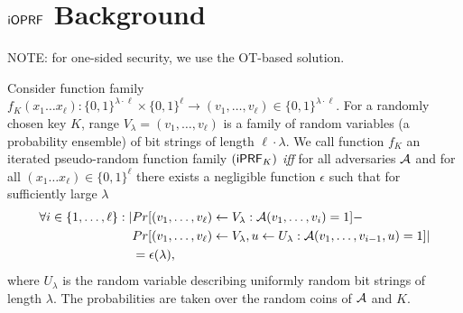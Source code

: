 \section{$\mathsf{i}\mathsf{OPRF}$ Background}
NOTE: for one-sided security, we use the OT-based solution.



\begin{definition}[$\iprf$]
  Consider function family
  $f_K(x_1\ldots{}x_\ell):\{0,1\}^{\lambda\cdot\ell}\times\{0,1\}^{\ell}\rightarrow{}(v_1,\ldots,v_\ell)\in\{0,1\}^{\lambda\cdot\ell}$. For
  a randomly chosen key $K$, range $V_\lambda=(v_1,\ldots,v_\ell)$ is
  a family of random variables (a probability ensemble) of bit strings
  of length $\ell\cdot\lambda$. We call function $f_K$ an iterated
  pseudo-random function family $(\mathsf{i}\mathsf{PRF}_K)$ \emph{iff} for all
  adversaries ${\mathcal{A}}$ and for all $(x_1\ldots{}x_\ell)\in\{0,1\}^\ell$
  there exists a negligible function $\epsilon$ such that for
  sufficiently large $\lambda$
\begin{align*}\forall{}i\in\{1,\ldots,\ell\}:|&Pr[(v_1,\ldots,v_\ell)\leftarrow{}V_\lambda:{\mathcal{A}}(v_1,\ldots,v_i)=1]-\\&Pr[(v_1,\ldots,v_\ell)\leftarrow{}V_\lambda,u\leftarrow{}U_\lambda:{\mathcal{A}}(v_1,\ldots,v_{i-1},u)=1]|\\&=\epsilon(\lambda),
  \end{align*}
  where $U_\lambda$ is the random variable describing uniformly random
  bit strings of length $\lambda$. The probabilities are taken over
  the random coins of ${\mathcal{A}}$ and $K$.

\end{definition}

